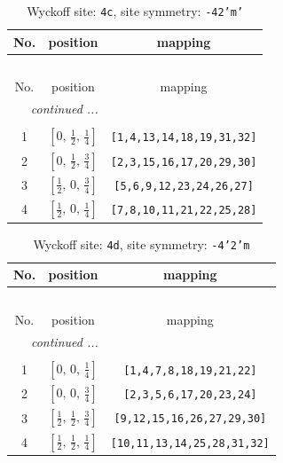 \documentclass[fleqn,8pt]{jsarticle}
\begin{document}
\renewcommand{\arraystretch}{1.2}
\begin{longtable}{ccc}
\caption{Wyckoff site: {\tt 4c}, site symmetry: {\tt -42'm'}}
 \\
 \hline \hline
No. & position & mapping \\ \hline \endfirsthead

\multicolumn{2}{l}{\tablename\ \thetable{}} \\
 \hline \hline
No. & position & mapping \\ \hline \endhead

 \hline \hline
\multicolumn{2}{r}{\footnotesize\it continued ...} \\ \endfoot

 \hline \hline
\multicolumn{2}{r}{} \\ \endlastfoot

1 & $\left[ 0,\, \frac{1}{2},\, \frac{1}{4} \right]$ & {\tt [1,4,13,14,18,19,31,32]} \\ \hline
2 & $\left[ 0,\, \frac{1}{2},\, \frac{3}{4} \right]$ & {\tt [2,3,15,16,17,20,29,30]} \\ \hline
3 & $\left[ \frac{1}{2},\, 0,\, \frac{3}{4} \right]$ & {\tt [5,6,9,12,23,24,26,27]} \\ \hline
4 & $\left[ \frac{1}{2},\, 0,\, \frac{1}{4} \right]$ & {\tt [7,8,10,11,21,22,25,28]} \\
\end{longtable}
\renewcommand{\arraystretch}{1.2}
\begin{longtable}{ccc}
\caption{Wyckoff site: {\tt 4d}, site symmetry: {\tt -4'2'm}}
 \\
 \hline \hline
No. & position & mapping \\ \hline \endfirsthead

\multicolumn{2}{l}{\tablename\ \thetable{}} \\
 \hline \hline
No. & position & mapping \\ \hline \endhead

 \hline \hline
\multicolumn{2}{r}{\footnotesize\it continued ...} \\ \endfoot

 \hline \hline
\multicolumn{2}{r}{} \\ \endlastfoot

1 & $\left[ 0,\, 0,\, \frac{1}{4} \right]$ & {\tt [1,4,7,8,18,19,21,22]} \\ \hline
2 & $\left[ 0,\, 0,\, \frac{3}{4} \right]$ & {\tt [2,3,5,6,17,20,23,24]} \\ \hline
3 & $\left[ \frac{1}{2},\, \frac{1}{2},\, \frac{3}{4} \right]$ & {\tt [9,12,15,16,26,27,29,30]} \\ \hline
4 & $\left[ \frac{1}{2},\, \frac{1}{2},\, \frac{1}{4} \right]$ & {\tt [10,11,13,14,25,28,31,32]} \\
\end{longtable}
\end{document}
